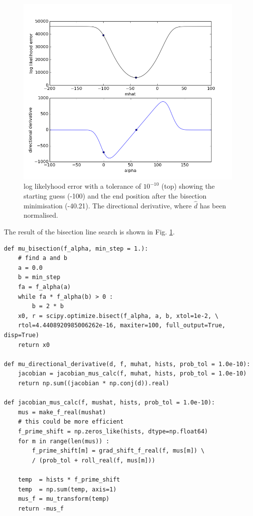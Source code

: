 \documentclass[11pt]{article}
\begin{document}
\begin{figure}[htp]
\centering
\includegraphics[scale=0.50]{figure_4.png}
\caption{log likelyhood error with a tolerance of $10^{-10}$ (top) showing the starting guess (-100) and the end position after the bisection minimisation (-40.21). The directional derivative, where $\hat{d}$ has been normalised.}
\label{bisection}
\end{figure}

The result of the bisection line search is shown in Fig. \ref{bisection}. 

\begin{verbatim}
def mu_bisection(f_alpha, min_step = 1.):
    # find a and b
    a = 0.0
    b = min_step
    fa = f_alpha(a)
    while fa * f_alpha(b) > 0 :
        b = 2 * b
    x0, r = scipy.optimize.bisect(f_alpha, a, b, xtol=1e-2, \
    rtol=4.4408920985006262e-16, maxiter=100, full_output=True, disp=True)
    return x0

def mu_directional_derivative(d, f, muhat, hists, prob_tol = 1.0e-10):
    jacobian = jacobian_mus_calc(f, muhat, hists, prob_tol = 1.0e-10)
    return np.sum((jacobian * np.conj(d)).real)

def jacobian_mus_calc(f, mushat, hists, prob_tol = 1.0e-10):
    mus = make_f_real(mushat)
    # this could be more efficient
    f_prime_shift = np.zeros_like(hists, dtype=np.float64)
    for m in range(len(mus)) :
        f_prime_shift[m] = grad_shift_f_real(f, mus[m]) \
        / (prob_tol + roll_real(f, mus[m]))
    
    temp  = hists * f_prime_shift 
    temp  = np.sum(temp, axis=1)
    mus_f = mu_transform(temp)
    return -mus_f

\end{verbatim}
\end{document}
